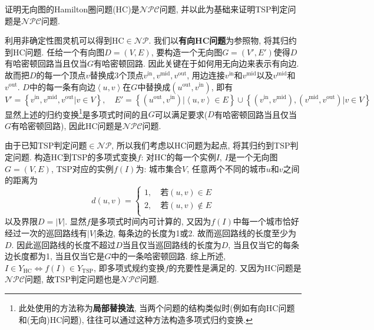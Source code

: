 \documentclass{article}
\begin{document}
\begin{homeworkProblem}
	证明无向图的Hamilton圈问题(HC)是$\mathcal{NPC}$问题, 并以此为基础来证明TSP判定问题是$\mathcal{NPC}$问题.

	\solution 利用非确定性图灵机可以得到HC$\in \mathcal{NP}$. 我们以\textbf{有向HC问题}为参照物, 将其归约到HC问题. 任给一个有向图$D=(V,E)$, 要构造一个无向图$G=\left( V',E' \right)$使得$D$有哈密顿回路当且仅当$G$有哈密顿回路. 因此关键在于如何用无向边来表示有向边. 故而把$D$的每一个顶点$v$替换成3个顶点$v^{\text{in}},v^{\text{mid}},v^{\text{out}}$, 用边连接$v^{\text{in}}$和$v^{\text{mid}}$以及$v^{\text{mid}}$和$v^{\text{out}}$. $D$中的每一条有向边$\left< u,v \right>$在$G$中替换成$\left( u^{\text{out}},v^{\text{in}} \right)$, 即有
	$$
	V'=\left\{ v^{\text{in}},v^{\text{mid}},v^{\text{out}}|v\in V \right\} ,\quad E'=\left\{ \left( u^{\text{out}},v^{\text{in}} \right) |\left< u,v \right> \in E \right\} \cup \left\{ \left( v^{\text{in}},v^{\text{mid}} \right) ,\left( v^{\text{mid}},v^{\text{out}} \right) |v\in V \right\} 
	$$
	显然上述的归约变换\footnote{此处使用的方法称为\textbf{局部替换法}, 当两个问题的结构类似时(例如有向HC问题和(无向)HC问题), 往往可以通过这种方法构造多项式归约变换.}是多项式时间的且$G$可以满足要求($D$有哈密顿回路当且仅当$G$有哈密顿回路), 因此HC问题是$\mathcal{NPC}$问题. 
	
	由于已知TSP判定问题$\in \mathcal{NP}$, 所以我们考虑以HC问题为起点, 将其归约到TSP判定问题. 构造HC到TSP的多项式变换$f$: 对HC的每一个实例$I$, $I$是一个无向图$G=(V,E)$, TSP对应的实例$f(I)$为: 城市集合$V$, 任意两个不同的城市$u$和$v$之间的距离为
	$$
	d\left( u,v \right) =\left\{ \begin{array}{c}
		1,\quad \text{若}\left( u,v \right) \in E\\
		2,\quad \text{若}\left( u,v \right) \notin E\\
	\end{array} \right.
	$$
	以及界限$D=|V|$. 显然$f$是多项式时间内可计算的, 又因为$f(I)$中每一个城市恰好经过一次的巡回路线有$|V|$条边, 每条边的长度为1或2. 故而巡回路线的长度至少为$D$. 因此巡回路线的长度不超过$D$当且仅当巡回路线的长度为$D$, 当且仅当它的每条边长度都为1, 当且仅当它是$G$中的一条哈密顿回路. 综上所述, $I\in Y_{\text{HC}}\Leftrightarrow f(I)\in Y_{\text{TSP}}$, 即多项式规约变换$f$的充要性是满足的. 又因为HC问题是$\mathcal{NPC}$问题, 故TSP判定问题也是$\mathcal{NPC}$问题.
\end{homeworkProblem}
\end{document}
